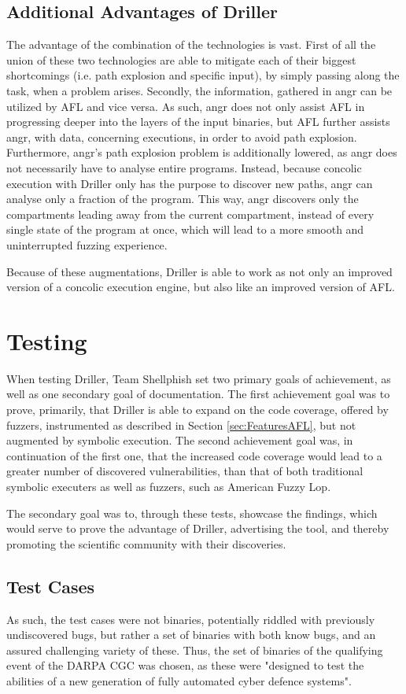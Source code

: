 \documentclass[a4paper]{article}
\begin{document}
\subsection{Additional Advantages of Driller}
\label{sec:DrillerAdditionalAdvantages}
The advantage of the combination of the technologies is vast. First of all the union of these two technologies are able to mitigate each of their biggest shortcomings (i.e. path explosion and specific input), by simply passing along the task, when a problem arises. Secondly, the information, gathered in angr can be utilized by AFL and vice versa. As such, angr does not only assist AFL in progressing deeper into the layers of the input binaries, but AFL further assists angr, with data, concerning executions, in order to avoid path explosion. Furthermore, angr's path explosion problem is additionally lowered, as angr does not necessarily have to analyse entire programs. Instead, because concolic execution with Driller only has the purpose to discover new paths, angr can analyse only a fraction of the program. This way, angr discovers only the compartments leading away from the current compartment, instead of every single state of the program at once, which will lead to a more smooth and uninterrupted fuzzing experience.

Because of these augmentations, Driller is able to work as not only an improved version of a concolic execution engine, but also like an improved version of AFL.
\section{Testing}
\label{sec:Testing}
When testing Driller, Team Shellphish set two primary goals of achievement, as well as one secondary goal of documentation. The first achievement goal was to prove, primarily, that Driller is able to expand on the code coverage, offered by fuzzers, instrumented as described in Section \ref{sec:FeaturesAFL}, but not augmented by symbolic execution. The second achievement goal was, in continuation of the first one, that the increased code coverage would lead to a greater number of discovered vulnerabilities, than that of both traditional symbolic executers as well as fuzzers, such as American Fuzzy Lop.

The secondary goal was to, through these tests, showcase the findings, which would serve to prove the advantage of Driller, advertising the tool, and thereby promoting the scientific community with their discoveries.
\subsection{Test Cases}
\label{sec:TestCases}
As such, the test cases were not binaries, potentially riddled with previously undiscovered bugs, but rather a set of binaries with both know bugs, and an assured challenging variety of these. Thus, the set of binaries of the qualifying event of the DARPA CGC was chosen, as these were "designed to test the abilities of a new generation of fully automated cyber defence systems"\cite{DARPA}.
\end{document}
